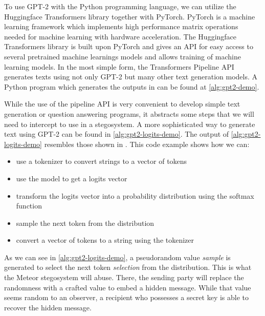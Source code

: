 To use GPT-2 with the Python programming language, we can utilize the Huggingface Transformers library together with PyTorch.
PyTorch is a machine learning framework which implements high performance matrix operations needed for machine learning with hardware acceleration.
The Huggingface Transformers library is built upon PyTorch and gives an API for easy access to several pretrained machine learnings models and allows training of machine learning models.
In the most simple form, the Transformers Pipeline API generates texts using not only GPT-2 but many other text generation models.
A Python program which generates the outputs in  can be found at \autoref{alg:gpt2-demo}.


While the use of the pipeline API is very convenient to develop simple text generation or question answering programs, it abstracts some steps that we will need to intercept to use in a stegosystem.
A more sophisticated way to generate text using GPT-2 can be found in \autoref{alg:gpt2-logits-demo}.
The output of \autoref{alg:gpt2-logits-demo} resembles those shown in . 
This code example shows how we can:

\begin{itemize}
	\item use a tokenizer to convert strings to a vector of tokens
	\item use the model to get a logits vector
	\item transform the logits vector into a probability distribution using the softmax function
	\item sample the next token from the distribution
	\item convert a vector of tokens to a string using the tokenizer
\end{itemize}

As we can see in \autoref{alg:gpt2-logits-demo}, a pseudorandom value \emph{sample} is generated to select the next token \emph{selection} from the distribution.
This is what the Meteor stegosystem will abuse.
There, the sending party will replace the randomness with a crafted value to embed a hidden message.
While that value seems random to an observer, a recipient who possesses a secret key is able to recover the hidden message.




